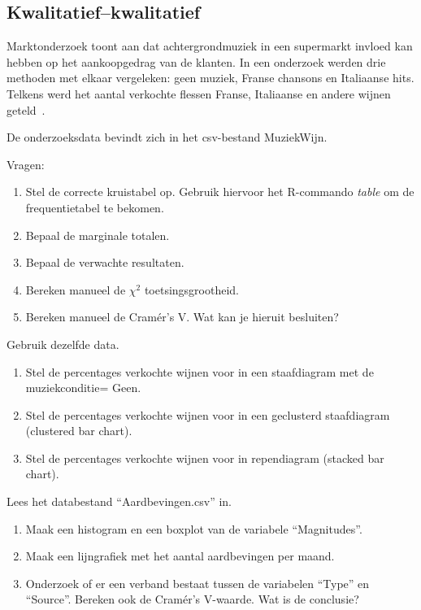 \subsection{Kwalitatief--kwalitatief}
\label{ssec:oef-kwal-kwal}

\begin{exercise}
  \label{ex:muziekwijn-analyse} %
  
  Marktonderzoek toont aan dat achtergrondmuziek in een supermarkt invloed kan hebben op het aankoopgedrag van de klanten. In een onderzoek werden drie methoden met elkaar vergeleken: geen muziek, Franse chansons en Italiaanse hits. Telkens werd het aantal verkochte flessen Franse, Italiaanse en andere wijnen geteld~\autocite{Ryan1998}.
  
  De onderzoeksdata bevindt zich in het csv-bestand MuziekWijn.
  
  Vragen:
  \begin{enumerate}
    \item Stel de correcte kruistabel op. Gebruik hiervoor het R-commando \textit{table} om de frequentietabel te bekomen.
    \item Bepaal de marginale totalen.
    \item Bepaal de verwachte resultaten.
    \item Bereken manueel de $\chi^{2}$ toetsingsgrootheid.  
    \item Bereken manueel de Cramér's V. Wat kan je hieruit besluiten?
  \end{enumerate}
\end{exercise}

\begin{exercise}
  \label{ex:muziekwijn-visualisatie}
  Gebruik dezelfde data.
  \begin{enumerate}
    \item Stel de percentages verkochte wijnen voor in een staafdiagram met de  muziekconditie= Geen.
    \item Stel de percentages verkochte wijnen voor in een geclusterd staafdiagram (clustered bar chart).
    \item Stel de percentages verkochte wijnen voor in rependiagram (stacked bar chart).
  \end{enumerate}
\end{exercise}

\begin{exercise}
  \label{ex:aardbevingen} %
  Lees het databestand ``Aardbevingen.csv'' in. 	
  \begin{enumerate}
    \item Maak een histogram en een boxplot van de variabele ``Magnitudes''.
    \item Maak een lijngrafiek met het aantal aardbevingen per maand.
    \item Onderzoek of er een verband bestaat tussen de variabelen ``Type'' en ``Source''. Bereken ook de Cramér's V-waarde. Wat is de conclusie?
  \end{enumerate}
\end{exercise}

